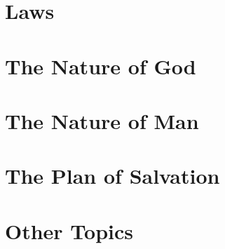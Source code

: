 	\section{Laws}
			
	\section{The Nature of God}
				
	\section{The Nature of Man}
	
			
	\section{The Plan of Salvation}
			
	\section{Other Topics}
	
			
\pagebreak{}
